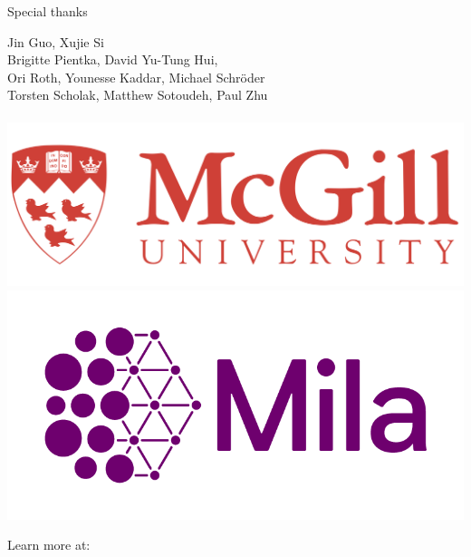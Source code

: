 \documentclass{beamer}
\begin{document}
\begin{frame}{Special thanks}
  \begin{center}
    \LARGE{
      Jin Guo, Xujie Si\\
      Brigitte Pientka, David Yu-Tung Hui,\\
      Ori Roth, Younesse Kaddar, Michael Schröder\\
      Torsten Scholak, Matthew Sotoudeh, Paul Zhu\\
      \phantom{}\\
    }
    \href{https://cs.mcgill.ca}{\includegraphics[scale=0.06]{../figures/mcgill_logo.png}}
    \href{https://mila.quebec}{\includegraphics[scale=0.1]{../figures/mila_logo.png}}
  \end{center}
\end{frame}

\begin{frame}
  \begin{center}
    \huge{Learn more at: \\~\\
    \href{https://tidyparse.github.io}{\color{blue}{https://tidyparse.github.io}}}
  \end{center}
\end{frame}
\end{document}
